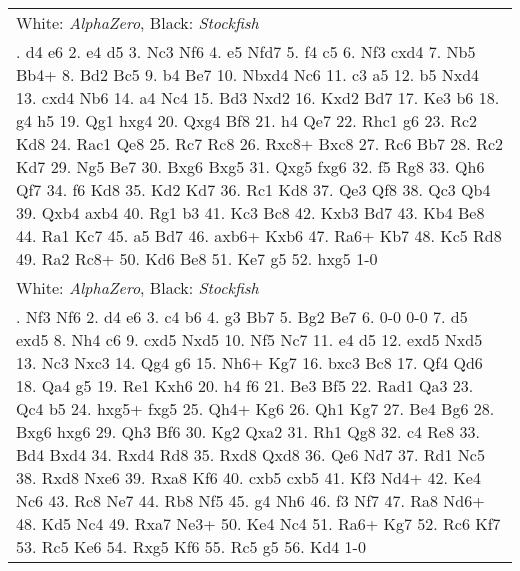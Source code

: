 \documentclass[12pt]{article}
\begin{document}
\begin{small}
\begin{longtable}{p{\textwidth}}
\hline
White: \emph{AlphaZero}, Black: \emph{Stockfish} \\\nopagebreak
1. d4 e6 2. e4 d5 3. Nc3 Nf6 4. e5 Nfd7 5. f4 c5 6. Nf3 cxd4 7. Nb5 Bb4+ 8. Bd2 Bc5 9. b4 Be7 10. Nbxd4 Nc6 11. c3 a5 12. b5 Nxd4 13. cxd4 Nb6 14. a4 Nc4 15. Bd3 Nxd2 16. Kxd2 Bd7 17. Ke3 b6 18. g4 h5 19. Qg1 hxg4 20. Qxg4 Bf8 21. h4 Qe7 22. Rhc1 g6 23. Rc2 Kd8 24. Rac1 Qe8 25. Rc7 Rc8 26. Rxc8+ Bxc8 27. Rc6 Bb7 28. Rc2 Kd7 29. Ng5 Be7 30. Bxg6 Bxg5 31. Qxg5 fxg6 32. f5 Rg8 33. Qh6 Qf7 34. f6 Kd8 35. Kd2 Kd7 36. Rc1 Kd8 37. Qe3 Qf8 38. Qc3 Qb4 39. Qxb4 axb4 40. Rg1 b3 41. Kc3 Bc8 42. Kxb3 Bd7 43. Kb4 Be8 44. Ra1 Kc7 45. a5 Bd7 46. axb6+ Kxb6 47. Ra6+ Kb7 48. Kc5 Rd8 49. Ra2 Rc8+ 50. Kd6 Be8 51. Ke7 g5 52. hxg5 1-0 \\
\hline
White: \emph{AlphaZero}, Black: \emph{Stockfish} \\\nopagebreak
1. Nf3 Nf6 2. d4 e6 3. c4 b6 4. g3 Bb7 5. Bg2 Be7 6. 0-0 0-0 7. d5 exd5 8. Nh4 c6 9. cxd5 Nxd5 10. Nf5 Nc7 11. e4 d5 12. exd5 Nxd5 13. Nc3 Nxc3 14. Qg4 g6 15. Nh6+ Kg7 16. bxc3 Bc8 17. Qf4 Qd6 18. Qa4 g5 19. Re1 Kxh6 20. h4 f6 21. Be3 Bf5 22. Rad1 Qa3 23. Qc4 b5 24. hxg5+ fxg5 25. Qh4+ Kg6 26. Qh1 Kg7 27. Be4 Bg6 28. Bxg6 hxg6 29. Qh3 Bf6 30. Kg2 Qxa2 31. Rh1 Qg8 32. c4 Re8 33. Bd4 Bxd4 34. Rxd4 Rd8 35. Rxd8 Qxd8 36. Qe6 Nd7 37. Rd1 Nc5 38. Rxd8 Nxe6 39. Rxa8 Kf6 40. cxb5 cxb5 41. Kf3 Nd4+ 42. Ke4 Nc6 43. Rc8 Ne7 44. Rb8 Nf5 45. g4 Nh6 46. f3 Nf7 47. Ra8 Nd6+ 48. Kd5 Nc4 49. Rxa7 Ne3+ 50. Ke4 Nc4 51. Ra6+ Kg7 52. Rc6 Kf7 53. Rc5 Ke6 54. Rxg5 Kf6 55. Rc5 g5 56. Kd4 1-0 \\
\hline
\end{longtable}
\end{small}
\end{document}
